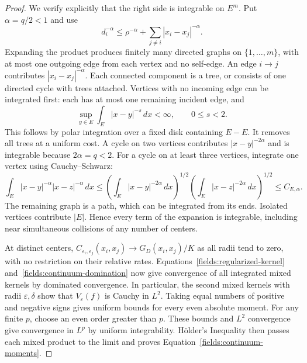 \begin{proof}
We verify explicitly that the right side is integrable on $E^m$.
Put $\alpha=q/2<1$ and use
\[
 d_i^{-\alpha}
    \leq\rho^{-\alpha}+\sum_{j\ne i}|x_i-x_j|^{-\alpha}.
\]
Expanding the product produces finitely many directed graphs on
$\{1,\ldots,m\}$, with at most one outgoing edge from each vertex
and no self-edge.  An edge $i\to j$ contributes
$|x_i-x_j|^{-\alpha}$.  Each connected component is a tree,
or consists of one directed cycle with trees attached.
Vertices with no incoming edge can be integrated first: each has
at most one remaining incident edge, and
\begin{equation}\label{fields:polar-integral}
 \sup_{y\in E}\int_E |x-y|^{-s}\,dx<\infty,\qquad 0\leq s<2.
\end{equation}
This follows by polar integration over a fixed disk containing
$E-E$.  It removes all trees at a uniform cost.  A cycle on two
vertices contributes $|x-y|^{-2\alpha}$ and is integrable because
$2\alpha=q<2$.  For a cycle on at least three vertices, integrate
one vertex using Cauchy--Schwarz:
\[
 \int_E |x-y|^{-\alpha}|x-z|^{-\alpha}\,dx
 \leq
 \left(\int_E|x-y|^{-2\alpha}\,dx\right)^{1/2}
 \left(\int_E|x-z|^{-2\alpha}\,dx\right)^{1/2}
 \leq C_{E,\alpha}.
\]
The remaining graph is a path, which can be integrated from its
ends.  Isolated vertices contribute $|E|$.  Hence every term of
the expansion is integrable, including near simultaneous
collisions of any number of centers.

At distinct centers,
$C_{\varepsilon_i,\varepsilon_j}(x_i,x_j)\to G_D(x_i,x_j)/K$
as all radii tend to zero, with no restriction on their relative
rates.  Equations~\eqref{fields:regularized-kernel}
and~\eqref{fields:continuum-domination} now give convergence of
all integrated mixed kernels by dominated convergence.
In particular, the second mixed kernels with radii
$\varepsilon,\delta$ show that $V_\varepsilon(f)$ is Cauchy
in $L^2$.  Taking equal numbers of positive and negative signs
gives uniform bounds for every even absolute moment.
For any finite $p$, choose an even order greater than $p$.
These bounds and $L^2$ convergence give convergence in $L^p$
by uniform integrability.  H\"older's Inequality then passes
each mixed product to the limit and proves
Equation~\eqref{fields:continuum-moments}.


\end{proof}
